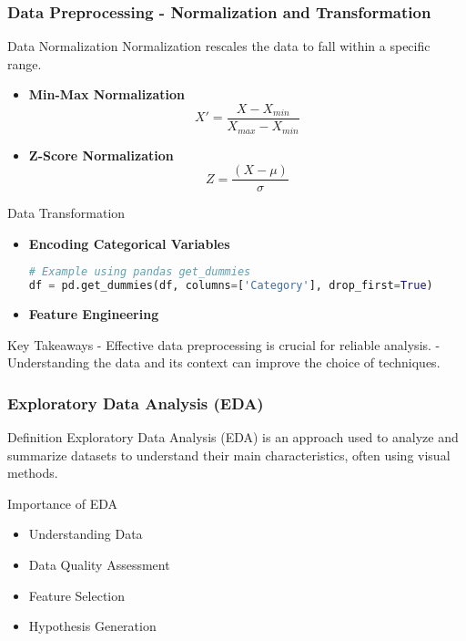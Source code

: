 \documentclass{beamer}
\begin{document}
\begin{frame}[fragile]
    \frametitle{Data Preprocessing - Normalization and Transformation}
    \begin{block}{Data Normalization}
        Normalization rescales the data to fall within a specific range.
        \begin{itemize}
            \item \textbf{Min-Max Normalization}
                \begin{equation}
                X' = \frac{X - X_{min}}{X_{max} - X_{min}}
                \end{equation}
            \item \textbf{Z-Score Normalization}
                \begin{equation}
                Z = \frac{(X - \mu)}{\sigma}
                \end{equation}
        \end{itemize}
    \end{block}
    
    \begin{block}{Data Transformation}
        \begin{itemize}
            \item \textbf{Encoding Categorical Variables}
            \begin{lstlisting}[language=Python]
# Example using pandas get_dummies
df = pd.get_dummies(df, columns=['Category'], drop_first=True)
            \end{lstlisting}
            \item \textbf{Feature Engineering}
        \end{itemize}
    \end{block}
    
    \begin{block}{Key Takeaways}
        - Effective data preprocessing is crucial for reliable analysis.
        - Understanding the data and its context can improve the choice of techniques.
    \end{block}
\end{frame}

\begin{frame}[fragile]
    \frametitle{Exploratory Data Analysis (EDA)}
    \begin{block}{Definition}
        Exploratory Data Analysis (EDA) is an approach used to analyze and summarize datasets to understand their main characteristics, often using visual methods.
    \end{block}
    \begin{block}{Importance of EDA}
        \begin{itemize}
            \item Understanding Data 
            \item Data Quality Assessment 
            \item Feature Selection 
            \item Hypothesis Generation 
        \end{itemize}
    \end{block}
\end{frame}
\end{document}
